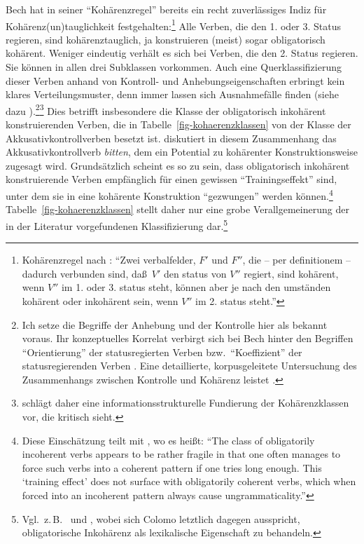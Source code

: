 Bech hat in seiner "`Kohärenzregel"' bereits ein recht zuverlässiges Indiz für Kohärenz\-(un)\-taug\-lich\-keit festgehalten:\footnote{Kohärenzregel nach \cite[\S 65]{Bech:55}: "`Zwei verbalfelder, $F'$ und $F''$, die -- per definitionem -- dadurch verbunden sind, da\ss\ $V'$ den status von $V''$ regiert, sind kohärent, wenn $V''$ im 1. oder 3. status steht, können aber je nach den umständen kohärent oder inkohärent sein, wenn $V''$ im 2. status steht."'} Alle Verben, die den 1. oder 3. Status regieren, sind kohärenztauglich, ja konstruieren (meist) sogar obligatorisch kohärent. Weniger eindeutig verhält es sich bei Verben, die den 2. Status regieren. Sie können in allen drei Subklassen vorkommen. Auch eine Querklassifizierung dieser Verben anhand von Kontroll- und Anhebungseigenschaften erbringt kein klares Verteilungsmuster, denn immer lassen sich Ausnahmefälle finden (siehe dazu \citealt[\S2.3]{Meurers:99}).\footnote{Ich setze die Begriffe der Anhebung und der Kontrolle hier als bekannt voraus. Ihr konzeptuelles Korrelat verbirgt sich bei Bech hinter den Begriffen "`Orientierung"' der statusregierten Verben bzw.\ "`Koeffizient"' der statusregierenden Verben \citep[Kapitel~3]{Bech:55}. Eine detaillierte, korpusgeleitete Untersuchung des Zusammenhangs zwischen Kontrolle und Kohärenz leistet \cite{Grosse:05}. }\footnote{\cite{Cook:01} schlägt daher eine informationsstrukturelle Fundierung der Kohärenzklassen vor, die \citet[Abschnitt~4.4]{Grosse:05} kritisch sieht.} Dies betrifft insbesondere die Klasse der obligatorisch inkohärent konstruierenden Verben, die in Tabelle~\ref{fig-kohaerenzklassen} von der Klasse der Akkusativkontrollverben besetzt ist. \cite{Grosse:05} diskutiert in diesem Zusammenhang das Akkusativkontrollverb {\it bitten}, dem ein Potential zu kohärenter Konstruktionsweise zugesagt wird. Grundsätzlich scheint es so zu sein, dass obligatorisch inkohärent konstruierende Verben empfänglich für einen gewissen "`Trainingseffekt"' sind, unter dem sie in eine kohärente Konstruktion "`gezwungen"' werden können.\footnote{Diese Einschätzung teilt \cite{Grosse:05} mit \citet[19, Fußnote 12]{Meurers:99}, wo es hei\ss t: "`The class of obligatorily incoherent verbs appears to be rather fragile in that one often manages to force such verbs into a coherent pattern if one tries long enough. This `training effect' does not surface with obligatorily coherent verbs, which when forced into an incoherent pattern always cause ungrammaticality."'} Tabelle~\ref{fig-kohaerenzklassen} stellt daher nur eine grobe Verallgemeinerung der in der Literatur vorgefundenen Klassifizierung dar.\footnote{Vgl.\ z.\,B.\ \citet[Kapitel~1]{Grosse:05} und \citet[Abschnitt~3.5.2, Tabelle~5, 207]{Colomo:11}, wobei sich Colomo letztlich dagegen ausspricht, obligatorische Inkohärenz als lexikalische Eigenschaft zu behandeln.}

